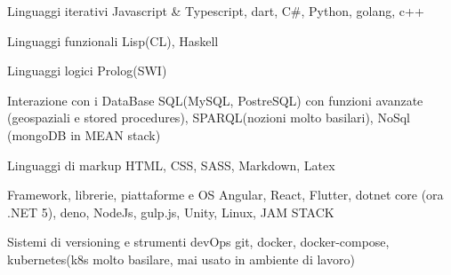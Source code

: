 

\begin{cvskills}

  \cvskill
    {Linguaggi iterativi} %
    {Javascript \& Typescript, dart, C\#, Python, golang, c++}

  \cvskill
    {Linguaggi funzionali} %
    {Lisp(CL), Haskell} %

  \cvskill
    {Linguaggi logici} %
    {Prolog(SWI)} %

  \cvskill
    {Interazione con i DataBase} %
    {SQL(MySQL, PostreSQL) con funzioni avanzate (geospaziali e stored procedures), SPARQL(nozioni molto basilari), NoSql (mongoDB in MEAN stack)} %

  \cvskill
    {Linguaggi di markup} %
    {HTML, CSS, SASS, Markdown, Latex} %

  \cvskill
    {Framework, librerie, piattaforme e OS} %
    {Angular, React, Flutter, dotnet core (ora .NET 5), deno, NodeJs, gulp.js, Unity, Linux, JAM STACK} %

  \cvskill
    {Sistemi di versioning e strumenti devOps} %
    {git, docker, docker-compose, kubernetes(k8s molto basilare, mai usato in ambiente di lavoro)} %

\end{cvskills}
